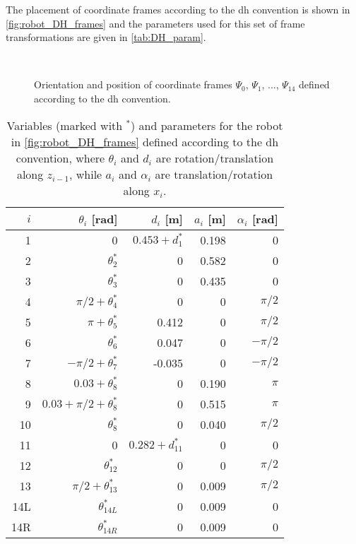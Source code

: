 The placement of coordinate frames according to the \gls{dh} convention is shown in \autoref{fig:robot_DH_frames} and the parameters used for this set of frame transformations are given in \autoref{tab:DH_param}.


\begin{figure}[htbp]
	\vspace*{-10mm}
	\hspace{-10mm}
	\vspace{5mm}\\
	\hspace*{-15mm}
	\caption{Orientation and position of coordinate frames $\Psi_0$, $\Psi_1$, ..., $\Psi_{14}$ defined according to the \gls{dh} convention.}
	\label{fig:robot_DH_frames}
\end{figure}

\begin{table}[htbp]
	\small
	\vspace*{-3mm}
	\centering
	\begin{tabular}{r | rrrr}\hline
		$i$  & $\theta_i$ [rad]& $d_i$ [m] & $a_i$ [m] & $\alpha_i$ [rad] \\\hline
		1 & 0 &  $0.453+d_1^*$ & 0.198 & 0 \\
		2 & $\theta_2^*$ & 0 & 0.582 & 0 \\
		3 & $\theta_3^*$ & 0 & 0.435 & 0\\
		4 & $\pi/2+\theta_4^*$ & 0 & 0 & $\pi/2$\\
		5 & $\pi+\theta_5^*$ & 0.412 & 0 & $\pi/2$ \\
		6 & $\theta_6^*$ & 0.047 & 0 & $-\pi/2$ \\
		7 & $-\pi/2+\theta_7^*$ & -0.035 & 0 & $-\pi/2$ \\
		8 & $0.03+\theta_8^*$ & 0 & 0.190 & $\pi$ \\
		9 & $0.03+\pi/2+\theta_8^*$ & 0 & 0.515 & $\pi$ \\
		10 & $\theta_8^*$ & 0 & 0.040 & $\pi/2$\\
		11 & 0 & $0.282+d_{11}^*$ & 0  & 0 \\
		12 & $\theta_{12}^*$ & 0 & 0 & $\pi/2$ \\
		13 & $\pi/2+\theta_{13}^*$ & 0 & 0.009 & $\pi/2$ \\
		14L & $\theta_{14L}^*$ & 0 & 0.009 & 0\\
		14R & $\theta_{14R}^*$ & 0 & 0.009 & 0 \\
	\end{tabular}
	\caption{Variables (marked with $^*$) and parameters for the robot in \autoref{fig:robot_DH_frames} defined according to the \gls{dh} convention, where $\theta_i$ and $d_i$ are rotation/translation along $z_{i-1}$, while $a_i$ and $\alpha_i$ are translation/rotation along $x_i$.}
	\label{tab:DH_param}
\end{table}

